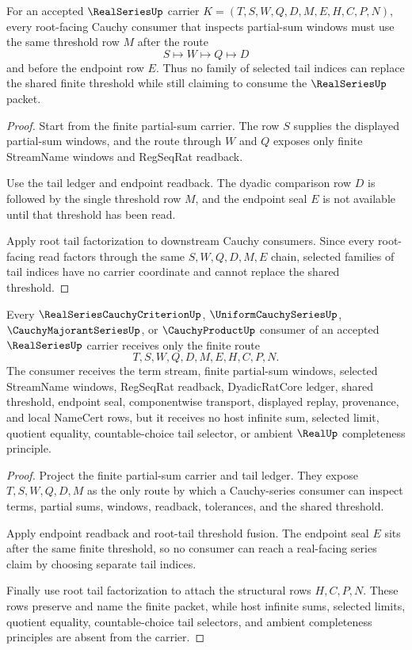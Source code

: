 \begin{theorem}
\label{thm:realseries-root-tail-threshold-fusion}
For an accepted $\RealSeriesUp$ carrier $K=(T,S,W,Q,D,M,E,H,C,P,N)$, every root-facing Cauchy consumer that inspects partial-sum windows must use the same threshold row $M$ after the route
$$
S\longmapsto W\longmapsto Q\longmapsto D
$$
and before the endpoint row $E$. Thus no family of selected tail indices can replace the shared finite threshold while still claiming to consume the $\RealSeriesUp$ packet.
\end{theorem}
\begin{proof}
Start from the finite partial-sum carrier. The row $S$ supplies the displayed partial-sum windows, and the route through $W$ and $Q$ exposes only finite StreamName windows and RegSeqRat readback.

Use the tail ledger and endpoint readback. The dyadic comparison row $D$ is followed by the single threshold row $M$, and the endpoint seal $E$ is not available until that threshold has been read.

Apply root tail factorization to downstream Cauchy consumers. Since every root-facing read factors through the same $S,W,Q,D,M,E$ chain, selected families of tail indices have no carrier coordinate and cannot replace the shared threshold.
\end{proof}

\begin{theorem}
\label{thm:realseries-cauchy-consumer-finite-readback}
Every $\RealSeriesCauchyCriterionUp$, $\UniformCauchySeriesUp$, $\CauchyMajorantSeriesUp$, or $\CauchyProductUp$ consumer of an accepted $\RealSeriesUp$ carrier receives only the finite route
$$
T,S,W,Q,D,M,E,H,C,P,N.
$$
The consumer receives the term stream, finite partial-sum windows, selected StreamName windows, RegSeqRat readback, DyadicRatCore ledger, shared threshold, endpoint seal, componentwise transport, displayed replay, provenance, and local NameCert rows, but it receives no host infinite sum, selected limit, quotient equality, countable-choice tail selector, or ambient $\RealUp$ completeness principle.
\end{theorem}
\begin{proof}
Project the finite partial-sum carrier and tail ledger. They expose $T,S,W,Q,D,M$ as the only route by which a Cauchy-series consumer can inspect terms, partial sums, windows, readback, tolerances, and the shared threshold.

Apply endpoint readback and root-tail threshold fusion. The endpoint seal $E$ sits after the same finite threshold, so no consumer can reach a real-facing series claim by choosing separate tail indices.

Finally use root tail factorization to attach the structural rows $H,C,P,N$. These rows preserve and name the finite packet, while host infinite sums, selected limits, quotient equality, countable-choice tail selectors, and ambient completeness principles are absent from the carrier.
\end{proof}
